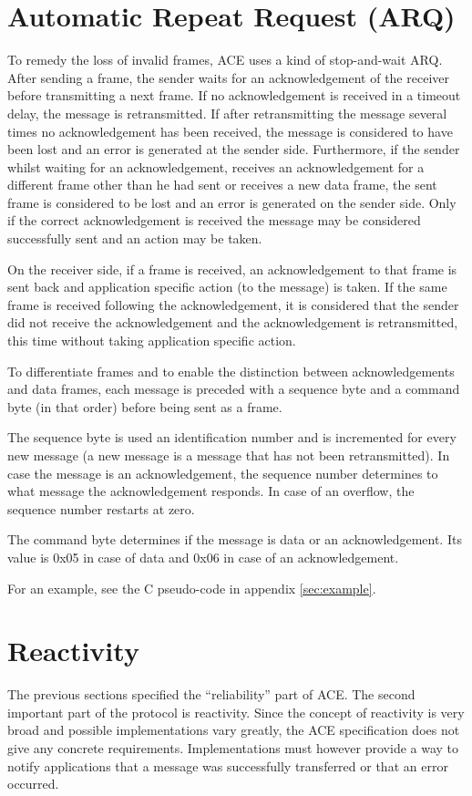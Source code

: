 \documentclass[10pt,a4paper]{article}
\begin{document}
\section{Automatic Repeat Request (ARQ)}
To remedy the loss of invalid frames, ACE uses a kind of stop-and-wait ARQ. After sending a frame, the sender waits for an acknowledgement of the receiver before transmitting a next frame. If no acknowledgement is received in a timeout delay, the message is retransmitted. If after retransmitting the message several times no acknowledgement has been received, the message is considered to have been lost and an error is generated at the sender side. Furthermore, if the sender whilst waiting for an acknowledgement, receives an acknowledgement for a different frame other than he had sent or receives a new data frame, the sent frame is considered to be lost and an error is generated on the sender side. Only if the correct acknowledgement is received the message may be considered successfully sent and an action may be taken.

On the receiver side, if a frame is received, an acknowledgement to that frame is sent back and application specific action (to the message) is taken. If the same frame is received following the acknowledgement, it is considered that the sender did not receive the acknowledgement and the acknowledgement is retransmitted, this time without taking application specific action.

To differentiate frames and to enable the distinction between acknowledgements and data frames, each message is preceded with a sequence byte and a command byte (in that order) before being sent as a frame.

The sequence byte is used an identification number and is incremented for every new message (a new message is a message that has not been retransmitted). In case the message is an acknowledgement, the sequence number determines to what message the acknowledgement responds. In case of an overflow, the sequence number restarts at zero.

The command byte determines if the message is data or an acknowledgement. Its value is 0x05 in case of data and 0x06 in case of an acknowledgement.

For an example, see the C pseudo-code in appendix \ref{sec:example}.

\section{Reactivity}
The previous sections specified the ``reliability'' part of ACE. The second important part of the protocol is reactivity. Since the concept of reactivity is very broad and possible implementations vary greatly, the ACE specification does not give any concrete requirements. Implementations must however provide a way to notify applications that a message was successfully transferred or that an error occurred.
\end{document}
